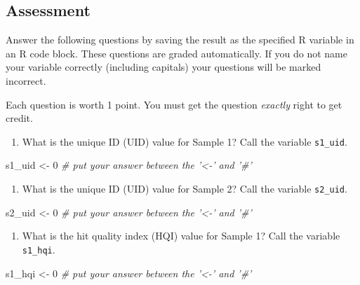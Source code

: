 \documentclass[]{tufte-book}
\newenvironment{Shaded}{}{}
\newcommand{\CommentTok}[1]{\textcolor[rgb]{0.38,0.63,0.69}{\textit{#1}}}
\newcommand{\DecValTok}[1]{\textcolor[rgb]{0.25,0.63,0.44}{#1}}
\newcommand{\NormalTok}[1]{#1}
\newcommand{\StringTok}[1]{\textcolor[rgb]{0.25,0.44,0.63}{#1}}
\providecommand{\tightlist}{%
  \setlength{\itemsep}{0pt}\setlength{\parskip}{0pt}}
\begin{document}
\hypertarget{vape-ftir-assessment}{%
\subsection{Assessment}\label{vape-ftir-assessment}}

Answer the following questions by saving the result as the specified R variable in an R code block. These questions are graded automatically. If you do not name your variable correctly (including capitals) your questions will be marked incorrect.

Each question is worth 1 point. You must get the question \emph{exactly} right to get credit.

\begin{enumerate}
\def\labelenumi{\arabic{enumi}.}
\tightlist
\item
  What is the unique ID (UID) value for Sample 1? Call the variable \texttt{s1\_uid}.
\end{enumerate}

\begin{Shaded}
\begin{Highlighting}[]
\NormalTok{s1_uid <-}\StringTok{ }\DecValTok{0}     \CommentTok{# put your answer between the '<-' and '#'}
\end{Highlighting}
\end{Shaded}

\begin{enumerate}
\def\labelenumi{\arabic{enumi}.}
\setcounter{enumi}{1}
\tightlist
\item
  What is the unique ID (UID) value for Sample 2? Call the variable \texttt{s2\_uid}.
\end{enumerate}

\begin{Shaded}
\begin{Highlighting}[]
\NormalTok{s2_uid <-}\StringTok{ }\DecValTok{0}     \CommentTok{# put your answer between the '<-' and '#'}
\end{Highlighting}
\end{Shaded}

\begin{enumerate}
\def\labelenumi{\arabic{enumi}.}
\setcounter{enumi}{2}
\tightlist
\item
  What is the hit quality index (HQI) value for Sample 1? Call the variable \texttt{s1\_hqi}.
\end{enumerate}

\begin{Shaded}
\begin{Highlighting}[]
\NormalTok{s1_hqi <-}\StringTok{ }\DecValTok{0}     \CommentTok{# put your answer between the '<-' and '#'}
\end{Highlighting}
\end{Shaded}
\end{document}
